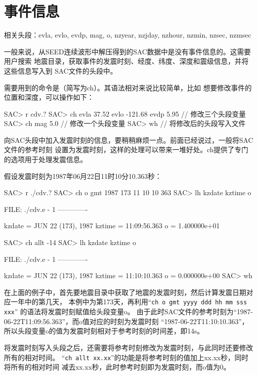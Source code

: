 \section{事件信息}
\label{sec:event-info}
相关头段：evla, evlo, evdp, mag, o, nzyear, nzjday, nzhour, nzmin, nzsec, nzmsec

一般来说，从SEED连续波形中解压得到的SAC数据中是没有事件信息的。这需要用户搜索
地震目录，获取事件的发震时刻、经度、纬度、深度和震级信息，并将这些信息写入到
SAC文件的头段中。

需要用到的命令是（简写为ch）。其语法相对来说比较简单，比如
想要修改事件的位置和深度，可以操作如下：
\begin{SACCode}
SAC> r cdv.?
SAC> ch evla 37.52 evlo -121.68 evdp 5.95   // 修改三个头段变量
SAC> ch mag 5.0                             // 修改一个头段变量
SAC> wh                                     // 将修改后的头段写入文件
\end{SACCode}

向SAC头段中加入发震时刻的信息，要稍稍麻烦一点。前面已经说过，一般将SAC文件的参考时刻
设置为发震时刻，这样的处理可以带来一堆好处。ch提供了专门的选项用于处理发震信息。

假设发震时刻为1987年06月22日11时10分10.363秒：
\begin{SACCode}
SAC> r ./cdv.?
SAC> ch o gmt 1987 173 11 10 10 363
SAC> lh kzdate kztime o
  
  FILE: ./cdv.e - 1
 -------------

     kzdate = JUN 22 (173), 1987
     kztime = 11:09:56.363
          o = 1.400000e+01
  
SAC> ch allt -14
SAC> lh kzdate kztime o
  
  FILE: ./cdv.e - 1
 -------------

     kzdate = JUN 22 (173), 1987
     kztime = 11:10:10.363
          o = 0.000000e+00
SAC> wh
\end{SACCode}

在上面的例子中，首先要地震目录中获取了地震的发震时刻，然后计算发震日期对应一年中的第几天，
本例中为第173天，再利用``\lstinline{ch o gmt yyyy ddd hh mm sss xxx}''
的语法将发震时刻赋值给头段变量o。
由于此时SAC文件的参考时刻为``1987-06-22T11:09:56.363''，而o值对应的时刻为发震时刻
``1987-06-22T11:10:10.363''，所以头段变量o的值为发震时刻相对于参考时刻的时间差，即14s。

将发震时刻写入头段之后，还需要将参考时刻修改为发震时刻，与此同时还要修改所有的相对时间。
``\lstinline{ch allt xx.xx}''的功能是将参考时刻的值加上xx.xx秒，同时将所有的相对时间
减去xx.xx秒，此时参考时刻即为发震时刻，而o值为0。

